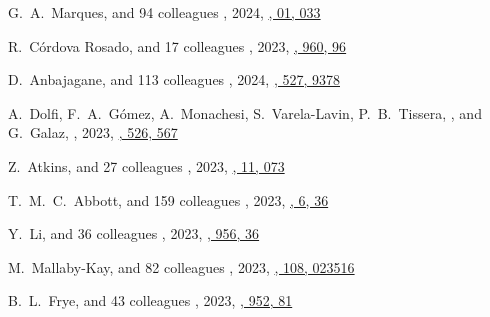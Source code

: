 \begin{etaremune}
\item
G.~A.~Marques, and 94 colleagues
,
2024, \href{https://ui.adsabs.harvard.edu/abs/2024JCAP...01..033M/abstract}{\jcap, 01, 033}
   
\item
R.~Córdova Rosado, and 17 colleagues
,
2023, \href{https://ui.adsabs.harvard.edu/abs/2023arXiv230706352C}{\apj, 960, 96}

\item
D.~Anbajagane, and 113 colleagues
,
2024, \href{https://ui.adsabs.harvard.edu/abs/2023arXiv231000059A}{\mnras, 527, 9378}
 
\item
A.~Dolfi, F.~A.~Gómez, A.~Monachesi, S.~Varela-Lavin, P.~B.~Tissera, \myself, and G.~Galaz,
,
2023, \href{https://ui.adsabs.harvard.edu/abs/2023MNRAS.526..567D}{\mnras, 526, 567}

\item
Z.~Atkins, and 27 colleagues
,
2023, \href{https://ui.adsabs.harvard.edu/abs/2023JCAP...11..073A/abstract}{\jcap, 11, 073}

\item
T.~M.~C.~Abbott, and 159 colleagues
,
2023, \href{https://ui.adsabs.harvard.edu/abs/2023OJAp....6E..36A}{\oja, 6, 36}

\item
Y.~Li, and 36 colleagues
,
2023, \href{https://ui.adsabs.harvard.edu/abs/2023ApJ...956...36L}{\apj, 956, 36}

\item
M.~Mallaby-Kay, and 82 colleagues
,
2023, \href{https://ui.adsabs.harvard.edu/abs/2023PhRvD.108b3516M}{\prd, 108, 023516}

\item
B.~L.~Frye, and 43 colleagues
,
2023, \href{https://ui.adsabs.harvard.edu/abs/2023ApJ...952...81F}{\apj, 952, 81}


\end{etaremune}
